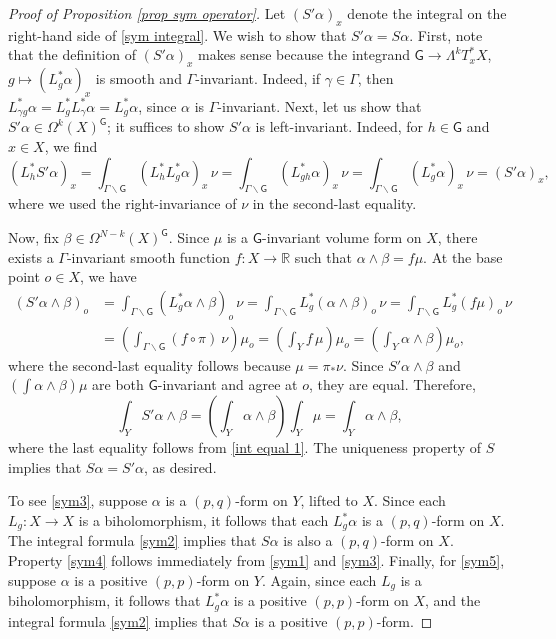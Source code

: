 \documentclass[11pt,reqno]{amsart}
\newcommand{\R}{\mathbb R}
\newcommand{\G}{\mathsf {G}}
\theoremstyle{plain}
\theoremstyle{definition}
\theoremstyle{remark}
\begin{document}
\begin{proof}[Proof of Proposition \ref{prop sym operator}]
    Let $(S' \alpha)_x$ denote the integral on the right-hand side of \eqref{sym integral}. We wish to show that $S' \alpha = S\alpha$. First, note that the definition of $(S' \alpha)_x$ makes sense because the integrand $\G \rightarrow \Lambda^k T_x^* X$,  $g \mapsto (L_g^* \alpha)_x$ is smooth and $\Gamma$-invariant. Indeed, if $\gamma \in \Gamma$, then $L_{\gamma g}^* \alpha = L_g^* L_\gamma^* \alpha = L_g^* \alpha$, since $\alpha$ is $\Gamma$-invariant. Next, let us show that $S' \alpha \in \Omega^k(X)^\G$; it suffices to show $S' \alpha$ is left-invariant. Indeed, for $h \in \G$ and $x \in X$, we find 
    $$(L^*_h S' \alpha)_x = \int_{\Gamma \backslash \G} (L_h^* L_g^* \alpha)_x \,\nu =\int_{\Gamma \backslash \G} (L_{gh}^* \alpha)_x \,\nu = \int_{\Gamma \backslash \G} (L_{g}^* \alpha)_x \,\nu = (S' \alpha)_x,$$
    where we used the right-invariance of $\nu$ in the second-last equality.

    Now, fix $\beta \in \Omega^{N-k}(X)^\G$. Since $\mu$ is a $\G$-invariant volume form on $X$, there exists a $\Gamma$-invariant smooth function $f:X \rightarrow \R$ such that 
    $\alpha \wedge \beta = f \mu.$ At the base point $o \in X$, we have
    \begin{align*}
        (S' \alpha \wedge \beta)_o &= \int_{\Gamma \backslash \G} (L_g^* \alpha \wedge \beta)_o \, \nu =  \int_{\Gamma \backslash \G}L_g^* (\alpha \wedge \beta)_o \, \nu=  \int_{\Gamma \backslash \G}L_g^* (f \mu)_o \, \nu  \\&=  \left( \int_{\Gamma \backslash \G} (f \circ \pi) \ \nu\right) \mu_o = \left( \int_Y f \, \mu\right) \mu_o = \left( \int_Y \alpha \wedge \beta\right) \mu_o,
    \end{align*}
    where the second-last equality follows because $\mu = \pi_* \nu$. Since $S' \alpha \wedge \beta$ and $\left( \int \alpha \wedge \beta\right) \mu$ are both $\G$-invariant and agree at $o$, they are equal. Therefore, 
    $$\int_Y S' \alpha \wedge \beta = \left( \int_Y \alpha \wedge \beta\right)\int_Y \mu  = \int_Y \alpha \wedge \beta,$$
    where the last equality follows from \eqref{int equal 1}. The uniqueness property of $S$ implies that $S\alpha = S'\alpha$, as desired.


    To see \eqref{sym3}, suppose $\alpha$ is a $(p,q)$-form on $Y$, lifted to $X$. Since each $L_g:X \rightarrow X$ is a biholomorphism, it follows that each $L_g^* \alpha$ is a $(p,q)$-form on $X$. The integral formula \eqref{sym2} implies that $S \alpha$ is also a $(p,q)$-form on $X$. Property \eqref{sym4} follows immediately from \eqref{sym1} and \eqref{sym3}. Finally, for \eqref{sym5}, suppose $\alpha$ is a positive $(p,p)$-form on $Y$. Again, since each $L_g$ is a biholomorphism, it follows that $L_g^* \alpha$ is a positive $(p,p)$-form on $X$, and the integral formula \eqref{sym2} implies that $S \alpha$ is a positive $(p,p)$-form.
\end{proof}

 

\end{document}
